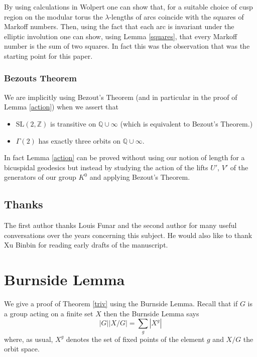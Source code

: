 \documentclass[12pt,a4paper]{amsart}
\def\ZZ{\mathbb{Z}}
\def\QQ{\mathbb{Q}}
\def\sl2{\mathrm{SL}(2, \ZZ)}
\def\g2{\Gamma(2)}
\begin{document}
 By using calculations in Wolpert \cite{saw}
 one can show that, for a suitable choice of cusp region 
 on the modular torus  the $\lambda$-lengths of arcs 
 coincide with the squares of Markoff numbers. 
 Then, using the fact that each arc is invariant under the 
 elliptic involution one can show, 
using Lemma \ref{squares},
 that every Markoff number is the sum of two squares.
 In fact this was the observation that was the starting point for this paper.
 
 
 \subsubsection{Bezouts Theorem}
 We are implicitly using  Bezout's Theorem
 (and in particular in the proof of Lemma \ref{action})
 when we assert that
 \begin{itemize}
 \item $\sl2$ is transitive on $\QQ \cup \infty$ (which is equivalent to Bezout's Theorem.)
 \item $\g2$ has exactly three orbits on $\QQ \cup \infty$.
 \end{itemize}
In fact Lemma \ref{action} can be proved
 without using our notion of length for a bicuspidal geodesics 
 but  instead by studying the action of 
 the lifts $U'$, $V'$  of the generators of our group $K^0$  
 and applying Bezout's Theorem.
 

\subsection{Thanks}

The first author thanks Louis Funar and the second author for  many useful conversations over the years concerning this subject. He would also like to thank Xu Binbin for reading early drafts of the manuscript.


\section{Burnside Lemma}

We give a proof of Theorem \ref{triv} using the Burnside Lemma.
Recall that if $G$ is  a group acting on a finite set $X$ then the Burnside Lemma says
\begin{equation}\label{burnside}
|G| |X/G| = \sum_{g} |X^g| 
\end{equation}  
where, as usual, 
 $X^g$ denotes the set of fixed points of the element $g$ 
 and $X/G$  the orbit space.
\end{document}
